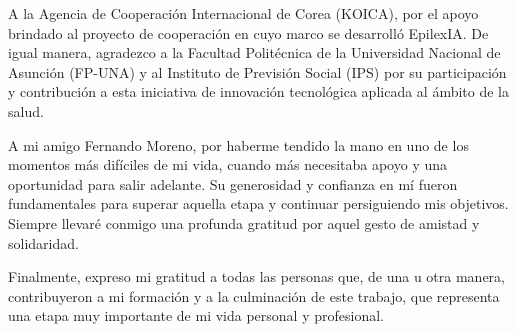 A la Agencia de Cooperación Internacional de Corea (KOICA),
por el apoyo brindado al proyecto de cooperación en cuyo
marco se desarrolló EpilexIA. De igual manera, agradezco
a la Facultad Politécnica de la Universidad Nacional de
Asunción (FP-UNA) y al Instituto de Previsión Social (IPS)
por su participación y contribución a esta iniciativa de
innovación tecnológica aplicada al ámbito de la salud.


A mi amigo Fernando Moreno, por haberme tendido
la mano en uno de los momentos más difíciles
de mi vida, cuando más necesitaba apoyo y una
oportunidad para salir adelante.
Su generosidad y confianza en mí fueron
fundamentales para superar aquella etapa
y continuar persiguiendo mis objetivos.
Siempre llevaré conmigo una profunda gratitud
por aquel gesto de amistad y solidaridad.


Finalmente, expreso mi gratitud a todas las personas que,
de una u otra manera, contribuyeron a mi formación y a
la culminación de este trabajo, que representa una etapa
muy importante de mi vida personal y profesional.


\par
\endgroup


